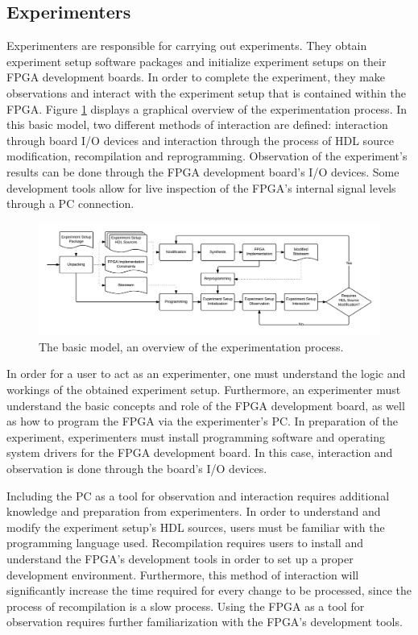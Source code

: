 \documentclass[openright]{template/uva-bachelor-thesis}
\begin{document}
\subsection{Experimenters}

Experimenters are responsible for carrying out experiments. They obtain experiment setup software packages and initialize experiment setups on their FPGA development boards. In order to complete the experiment, they make observations and interact with the experiment setup that is contained within the FPGA. Figure \ref{fig:process-experimentation-basic} displays a graphical overview of the experimentation process. In this basic model, two different methods of interaction are defined: interaction through board I/O devices and interaction through the process of HDL source modification, recompilation and reprogramming. Observation of the experiment's results can be done through the FPGA development board's I/O devices. Some development tools allow for live inspection of the FPGA's internal signal levels through a PC connection.

\begin{figure}[h]
    \centering
    \includegraphics[width=\textwidth]{img/processes-basic-experimentation}
    \caption{The basic model, an overview of the experimentation process.}
    \label{fig:process-experimentation-basic}
\end{figure}

In order for a user to act as an experimenter, one must understand the logic and workings of the obtained experiment setup. Furthermore, an experimenter must understand the basic concepts and role of the FPGA development board, as well as how to program the FPGA via the experimenter's PC. In preparation of the experiment, experimenters must install programming software and operating system drivers for the FPGA development board. In this case, interaction and observation is done through the board's I/O devices. 

Including the PC as a tool for observation and interaction requires additional knowledge and preparation from experimenters. In order to understand and modify the experiment setup's HDL sources, users must be familiar with the programming language used. Recompilation requires users to install and understand the FPGA's development tools in order to set up a proper development environment. Furthermore, this method of interaction will significantly increase the time required for every change to be processed, since the process of recompilation is a slow process. Using the FPGA as a tool for observation requires further familiarization with the FPGA's development tools.
\end{document}
